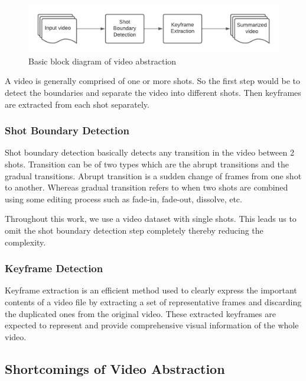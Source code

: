 \documentclass[rnd]{mas_proposal}
\begin{document}
\begin{figure}[h!]
    \centering
    \includegraphics[width=\textwidth]{images/video_abstraction.png}
    \caption{Basic block diagram of video abstraction \cite{Sadiq2020}}
    \label{fig:video_abstraction}
\end{figure}

A video is generally comprised of one or more shots. So the first step would be to detect the boundaries and separate the video into different shots. Then keyframes are extracted from each shot separately.

\subsubsection{Shot Boundary Detection}

Shot boundary detection basically detects any transition in the video between 2 shots. Transition can be of two types which are the abrupt transitions and the gradual transitions. Abrupt transition is a sudden change of frames from one shot to another. Whereas gradual transition refers to when two shots are combined using some editing process such as fade-in, fade-out, dissolve, etc.

Throughout this work, we use a video dataset with single shots. This leads us to omit the shot boundary detection step completely thereby reducing the complexity.

\subsubsection{Keyframe Detection}

Keyframe extraction is an efficient method used to clearly express the important contents of a video file by extracting a set of representative frames and discarding the duplicated ones from the original video. These extracted keyframes are expected to represent and provide comprehensive visual information of the whole video.

\subsection{Shortcomings of Video Abstraction}
\end{document}
